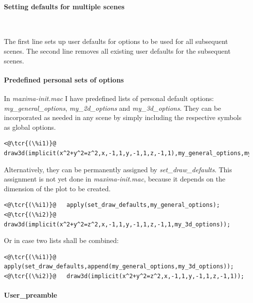\documentclass[../Maxima_Workbook.tex]{subfiles}
\begin{document}
\paragraph{Setting defaults for multiple scenes} \mbox{}

\lz {} \hfill \tcr{[function]} \\

\lz The first line sets up user defaults for options to be used for all subsequent scenes. The second line removes all existing user defaults for the subsequent scenes.

\paragraph{Predefined personal sets of options} \mbox{}

\lz In \emph{maxima-init.mac} I have predefined lists of personal default options: \emph{my\_general\_options}, \emph{my\_2d\_options} and \emph{my\_3d\_options}. They can be incorporated as needed in any scene by simply including the respective symbols as global options. 

\lz \begin{lstlisting}
<@\tcr{(\%i1)}@   draw3d(implicit(x^2+y^2=z^2,x,-1,1,y,-1,1,z,-1,1),my_general_options,my_3d_options);
\end{lstlisting}

\lz Alternatively, they can be permanently assigned by \emph{set\_draw\_defaults}. This assignment is not yet done in \emph{maxima-init.mac}, because it depends on the dimension of the plot to be created.

\lz \begin{lstlisting}
<@\tcr{(\%i1)}@   apply(set_draw_defaults,my_general_options);
<@\tcr{(\%i2)}@   draw3d(implicit(x^2+y^2=z^2,x,-1,1,y,-1,1,z,-1,1,my_3d_options));
\end{lstlisting}

\lz Or in case two lists shall be combined:

\lz \begin{lstlisting}
<@\tcr{(\%i1)}@   apply(set_draw_defaults,append(my_general_options,my_3d_options));
<@\tcr{(\%i2)}@   draw3d(implicit(x^2+y^2=z^2,x,-1,1,y,-1,1,z,-1,1));
\end{lstlisting}

\paragraph{User\_preamble} \mbox{}
\end{document}
